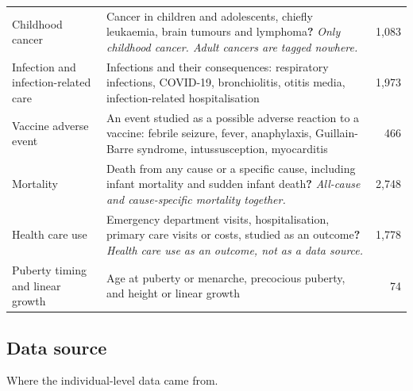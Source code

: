 \documentclass[10pt]{article}
\begin{document}
\begin{longtable}{@{}P{3.6cm}P{9.4cm}r@{}}
Childhood cancer & Cancer in children and adolescents, chiefly leukaemia, brain tumours and lymphoma\newline\textbf{?} \emph{Only childhood cancer. Adult cancers are tagged nowhere.} & 1,083\\
Infection and infection-related care & Infections and their consequences: respiratory infections, COVID-19, bronchiolitis, otitis media, infection-related hospitalisation & 1,973\\
Vaccine adverse event & An event studied as a possible adverse reaction to a vaccine: febrile seizure, fever, anaphylaxis, Guillain-Barre syndrome, intussusception, myocarditis & 466\\
Mortality & Death from any cause or a specific cause, including infant mortality and sudden infant death\newline\textbf{?} \emph{All-cause and cause-specific mortality together.} & 2,748\\
Health care use & Emergency department visits, hospitalisation, primary care visits or costs, studied as an outcome\newline\textbf{?} \emph{Health care use as an outcome, not as a data source.} & 1,778\\
Puberty timing and linear growth & Age at puberty or menarche, precocious puberty, and height or linear growth & 74\\
\bottomrule\end{longtable}
\subsection{Data source}
Where the individual-level data came from.
\end{document}
